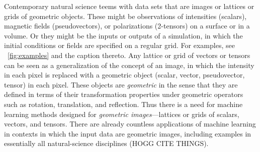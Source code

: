 \documentclass{article}
\theoremstyle{plain}
\newcommand{\figref}[1]{\figurename~\ref{#1}}
\begin{document}
Contemporary natural science teems with data sets that are images or lattices or grids of geometric objects.
These might be observations of intensities (scalars), magnetic fields (pseudovectors), or polarizations (2-tensors) on a surface or in a volume.
Or they might be the inputs or outputs of a simulation, in which the initial conditions or fields are specified on a regular grid.
For examples, see \figref{fig:examples} and the caption thereto.
Any lattice or grid of vectors or tensors can be seen as a generalization of the concept of an image, in which the intensity in each pixel is replaced with a geometric object (scalar, vector, pseudovector, tensor) in each pixel.
These objects are \emph{geometric} in the sense that they are defined in terms of their transformation properties under geometric operators such as rotation, translation, and reflection.
Thus there is a need for machine learning methods designed for \emph{geometric images}---lattices or grids of scalars, vectors, and tensors.
There are already countless applications of machine learning in contexts in which the input data are geometric images, including examples in essentially all natural-science disciplines (HOGG CITE THINGS).
\end{document}

